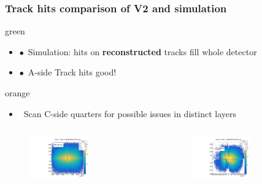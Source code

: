 \documentclass[xcolor=dvipsnames, aspectratio=1610, 12pt]{beamer}
\begin{document}
\begin{frame}\frametitle{Track hits comparison of V2 and simulation}
\begin{mybox}{green}{}
  \begin{itemize}
    \item $\bullet$\, Simulation: hits on \textbf{reconstructed} tracks fill whole detector
    \item $\bullet$\, A-side Track hits good!
  \end{itemize}
\end{mybox}
\begin{mybox}{orange}{}
  \begin{itemize}
    \item \to\, Scan C-side quarters for possible issues in distinct layers
  \end{itemize}
\end{mybox}
  \begin{columns}
    \begin{column}[c]{0.48\textwidth}
      \begin{figure}
        \centering
        \includegraphics[width=0.6\textwidth]{logos/nodeXY_MC.pdf}%
      \end{figure}
    \end{column}
    \begin{column}[c]{0.48\textwidth}
      \begin{figure}
        \centering
        \includegraphics[width=0.6\textwidth]{plots/combining_2D_nodeXY_v2.pdf}%
      \end{figure}
    \end{column}
  \end{columns}
\end{frame}
\end{document}
